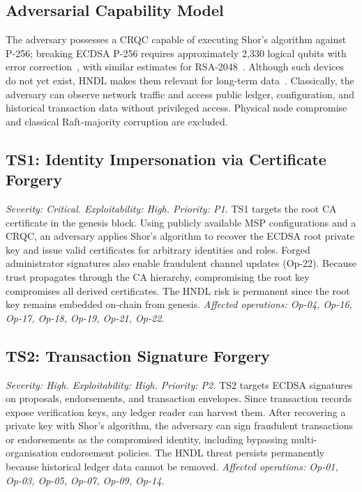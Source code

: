 \documentclass[conference]{IEEEtran}
\begin{document}
\subsection{Adversarial Capability Model}
The adversary possesses a CRQC capable of executing Shor's algorithm against
P-256; breaking ECDSA P-256 requires approximately 2{,}330 logical qubits with
error correction~\cite{roetteler2017}, with similar estimates for
RSA-2048~\cite{gidney2021}. Although such devices do not yet exist, HNDL makes
them relevant for long-term data~\cite{mosca2018}. Classically, the adversary
can observe network traffic and access public ledger, configuration, and
historical transaction data without privileged access. Physical node compromise
and classical Raft-majority corruption are excluded.


\subsection{TS1: Identity Impersonation via Certificate Forgery}
\textit{Severity: Critical. Exploitability: High. Priority: P1.}
TS1 targets the root CA certificate in the genesis block. Using publicly available MSP configurations and a CRQC, an adversary applies Shor's algorithm to recover the ECDSA root private key and issue valid certificates for arbitrary identities and roles. Forged administrator signatures also enable fraudulent channel updates (Op-22). Because trust propagates through the CA hierarchy, compromising the root key compromises all derived certificates. The HNDL risk is permanent since the root key remains embedded on-chain from genesis. \emph{Affected operations: Op-04, Op-16, Op-17, Op-18, Op-19, Op-21, Op-22.}

\subsection{TS2: Transaction Signature Forgery}
\textit{Severity: High. Exploitability: High. Priority: P2.}
TS2 targets ECDSA signatures on proposals, endorsements, and transaction envelopes. Since transaction records expose verification keys, any ledger reader can harvest them. After recovering a private key with Shor's algorithm, the adversary can sign fraudulent transactions or endorsements as the compromised identity, including bypassing multi-organisation endorsement policies. The HNDL threat persists permanently because historical ledger data cannot be removed. \emph{Affected operations: Op-01, Op-03, Op-05, Op-07, Op-09, Op-14.}
\end{document}
